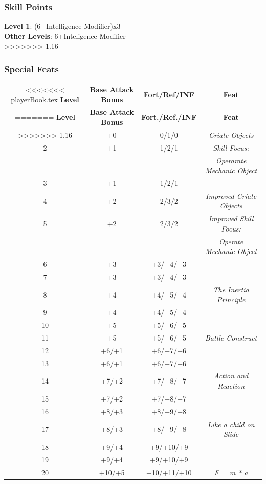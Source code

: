 \documentclass[ letterpaper,12pt]{article}
\begin{document}
\subsubsection{Skill Points}
{\bf Level 1}: (6+Intelligence Modifier)x3\\
{\bf Other Levels}: 6+Inteligence Modifier\\
>>>>>>> 1.16

\subsubsection{Special Feats}
\begin{center} \begin{tabular}{|c||c|c|c|}
\hline
<<<<<<< playerBook.tex
{\bf Level}&{\bf Base Attack Bonus}&{\bf Fort/Ref/INF}&{\bf Feat}\\
=======
{\bf Level}&{\bf Base Attack Bonus}&{\bf Fort./Ref./INF}&{\bf Feat}\\
>>>>>>> 1.16
\hline
1&+0&0/1/0&{\it Criate Objects }\\
\hline
2&+1&1/2/1&{\it Skill Focus:}\\
 & & & {\it Operarate Mechanic Object}\\
\hline
3&+1&1/2/1&\\
\hline
4&+2&2/3/2&{\it Improved Criate Objects}\\
\hline
5&+2&2/3/2&{\it Improved Skill Focus:}\\
&&&{\it Operate Mechanic Object}\\
\hline
6&+3&+3/+4/+3&\\
\hline
7&+3&+3/+4/+3&\\
\hline
8&+4&+4/+5/+4&{\it The Inertia Principle}\\
\hline
9&+4&+4/+5/+4&\\
\hline
10&+5&+5/+6/+5&\\
\hline
11&+5&+5/+6/+5&{\it Battle Construct}\\
\hline
12&+6/+1&+6/+7/+6&\\
\hline
13&+6/+1&+6/+7/+6&\\
\hline
14&+7/+2&+7/+8/+7&{\it Action and Reaction}\\
\hline
15&+7/+2&+7/+8/+7&\\
\hline
16&+8/+3&+8/+9/+8&\\
\hline
17&+8/+3&+8/+9/+8&{\it Like a child on Slide}\\
\hline
18&+9/+4&+9/+10/+9&\\
\hline
19&+9/+4&+9/+10/+9&\\
\hline
20&+10/+5&+10/+11/+10&{\it F = m * a}\\
\hline
\end{tabular} \end{center}
\end{document}
